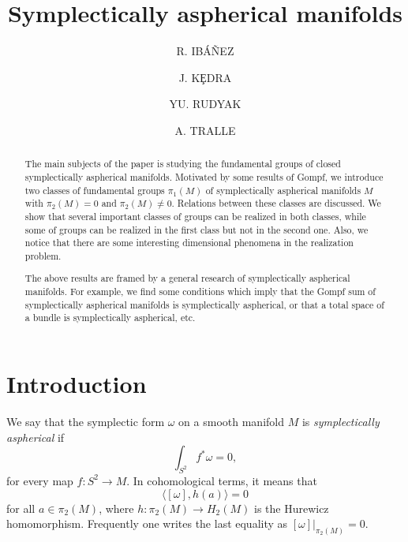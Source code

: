 \documentclass[12pt, twoside]{amsart}
\theoremstyle{plain}
\theoremstyle{definition}
\numberwithin{equation}{section}
\begin{document}
\title[Symplectically aspherical manifolds]{Symplectically aspherical 
manifolds}

\author{R. IB\'A\~NEZ}
\author{J. K\c EDRA}
\author{YU. RUDYAK}
\author{A. TRALLE}
\address{R. Ib\'a\~nez, Departamento de Matem\'aticas, Facultad de
Ciencias, Universidad del Pais Vasco, Apdo. 644, 48080 Bilbao, Spain}
\address{J. K\c edra, Institute of Mathematics, University of Szczecin,
Wielkopolska 15, 70451 Szczecin, Poland}
\address {Yu. Rudyak, Department of Mathematics, University of Florida, 
358 Little Hall, Gainesville, FL 32601, USA}
\address{A. Tralle, Department of Mathematics, University of Warmia and 
Mazury,
10561 Olsztyn, Poland}

\begin{abstract} 
The main subjects of the paper is studying the fundamental groups 
of closed symplectically aspherical manifolds. Motivated by some results of 
Gompf, we  introduce two classes of fundamental groups $\pi_1(M)$ of 
symplectically  aspherical manifolds $M$ with $\pi_2(M)=0$ and $\pi_2(M)\neq 0$. 
Relations between these classes are discussed. We show that several important 
classes of groups can be realized in both classes, while some of groups can be 
realized in the first class but not in the second one. Also, we notice that 
there are some interesting dimensional phenomena in the realization problem.

The above results are framed by a general research of symplectically aspherical 
manifolds. For example, we find some conditions which imply that the 
Gompf sum of symplectically aspherical manifolds is symplectically 
aspherical, or that a total space of a bundle is symplectically aspherical, etc.
\end{abstract}


\maketitle

\section*{Introduction}
 We say that the symplectic form $\omega$ on a smooth manifold $M$ is {\it 
symplectically aspherical} if
$$
\int_{S^2}f^*\omega=0,
$$ 
for every map $f: S^2\to M$. In cohomological terms, it means that
$$
\langle [\omega], h(a)\rangle=0
$$
for all $a\in\pi_2(M)$, where $h:\pi_2(M)\to H_2(M)$ is the Hurewicz
homomorphism. Frequently one writes the last equality as
$[\omega]|_{\pi_2(M)}=0$. 
\end{document}
